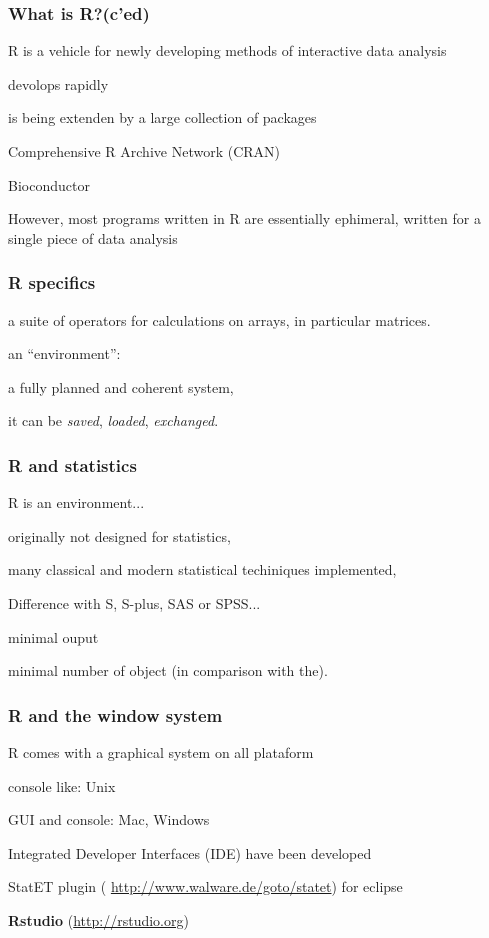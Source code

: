 \documentclass[xcolor=dvipsnames]{beamer}
\begin{document}
   \begin{frame}
   \frametitle{What is R?(c'ed)}
	
    \ben
      \item R is a vehicle for newly developing methods of interactive data analysis
 
      		\bit
      			\item devolops rapidly
      			\item is being extenden by a large collection of packages
			    \bit
				\item Comprehensive R Archive Network (CRAN)
				\item Bioconductor
			    \eit
      			
      		\eit
      	\item However, most programs written in R are essentially ephimeral, written for a single piece of data analysis
    \een
  \end{frame}
  
 

   \begin{frame}
   \frametitle{R specifics}
	
    \bit
      \item a suite of operators for calculations on arrays, in particular matrices.
      \item an ``environment'':
      		\bit
      			\item a fully planned and coherent system,
      			\item it can be \emph{saved}, \emph{loaded}, \emph{exchanged}.
      		\eit
    \eit
  \end{frame}
  
  \begin{frame}
  \frametitle{R and statistics}
   \bit
      \item R is an environment...
	  \bit
	    \item originally not designed for statistics,
	    \item many classical and modern statistical techiniques implemented,
	  \eit 
\item Difference with S, S-plus, SAS or SPSS...
	  \bit
	    \item minimal ouput
	    \item minimal number of object (in comparison with the).
	  \eit
      \eit
     \end{frame}

   
     \begin{frame}
     \frametitle{R and the window system}
      \bit
	\item R comes with a graphical system on all plataform
	  \bit
	    \item console like: Unix
	    \item GUI and console: Mac, Windows
	  \eit
	 \item Integrated Developer Interfaces (IDE) have been developed
	 \bit
	    \item StatET plugin ( \url{http://www.walware.de/goto/statet}) for eclipse
	    \item \textbf{Rstudio} (\url{http://rstudio.org})
	 \eit
      \eit
      
     \end{frame}
     
\end{document}
